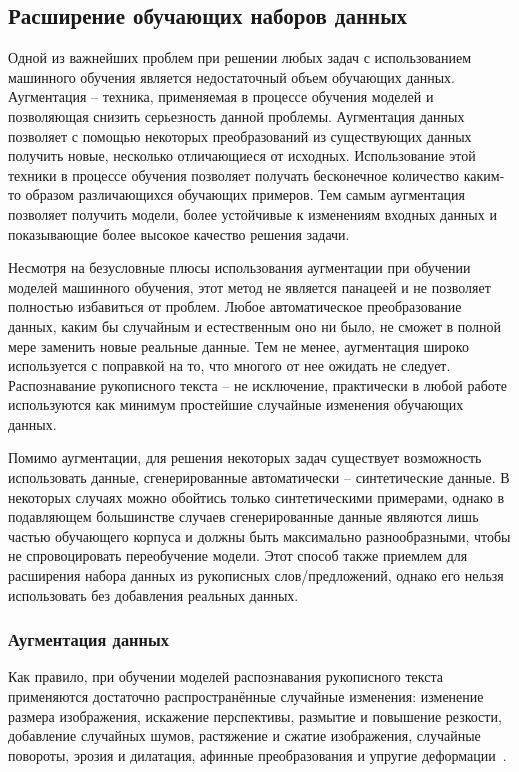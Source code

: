 \subsection{Расширение обучающих наборов данных}
\label{subsec:augmentation-generation}

Одной из важнейших проблем при решении любых задач с использованием машинного обучения является недостаточный объем обучающих данных.
Аугментация -- техника, применяемая в процессе обучения моделей и позволяющая снизить серьезность данной проблемы.
Аугментация данных позволяет с помощью некоторых преобразований из существующих данных получить новые, несколько отличающиеся от исходных.
Использование этой техники в процессе обучения позволяет получать бесконечное количество каким-то образом различающихся обучающих примеров.
Тем самым аугментация позволяет получить модели, более устойчивые к изменениям входных данных и показывающие более высокое качество решения задачи.

Несмотря на безусловные плюсы использования аугментации при обучении моделей машинного обучения, этот метод не является панацеей и не позволяет полностью избавиться от проблем.
Любое автоматическое преобразование данных, каким бы случайным и естественным оно ни было, не сможет в полной мере заменить новые реальные данные.
Тем не менее, аугментация широко используется с поправкой на то, что многого от нее ожидать не следует.
Распознавание рукописного текста -- не исключение, практически в любой работе используются как минимум простейшие случайные изменения обучающих данных.

Помимо аугментации, для решения некоторых задач существует возможность использовать данные, сгенерированные автоматически -- синтетические данные.
В некоторых случаях можно обойтись только синтетическими примерами, однако в подавляющем большинстве случаев сгенерированные данные
являются лишь частью обучающего корпуса и должны быть максимально разнообразными, чтобы не спровоцировать переобучение модели.
Этот способ также приемлем для расширения набора данных из рукописных слов/предложений, однако его нельзя использовать без добавления реальных данных.

\subsubsection{Аугментация данных}
\label{subsubsec:augmentation}

Как правило, при обучении моделей распознавания рукописного текста применяются достаточно распространённые случайные изменения:
изменение размера изображения, искажение перспективы, размытие и повышение резкости, добавление случайных шумов, растяжение и сжатие изображения,
случайные повороты, эрозия и дилатация, афинные преобразования и упругие деформации~\cite{sueiras2021continuous}.

